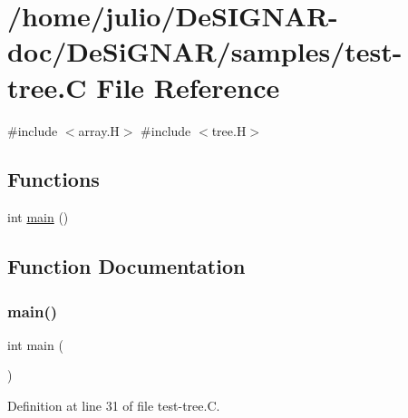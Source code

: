 \hypertarget{test-tree_8_c}{}\section{/home/julio/\+De\+S\+I\+G\+N\+A\+R-\/doc/\+De\+Si\+G\+N\+A\+R/samples/test-\/tree.C File Reference}
\label{test-tree_8_c}
{\ttfamily \#include $<$array.\+H$>$}\newline
{\ttfamily \#include $<$tree.\+H$>$}\newline
\subsection*{Functions}
\begin{DoxyCompactItemize}
\item 
int \hyperlink{test-tree_8_c_ae66f6b31b5ad750f1fe042a706a4e3d4}{main} ()
\end{DoxyCompactItemize}


\subsection{Function Documentation}
\mbox{\label{test-tree_8_c_ae66f6b31b5ad750f1fe042a706a4e3d4}} 
\subsubsection{\texorpdfstring{main()}{main()}}
{\footnotesize\ttfamily int main (\begin{DoxyParamCaption}{ }\end{DoxyParamCaption})}



Definition at line 31 of file test-\/tree.\+C.

